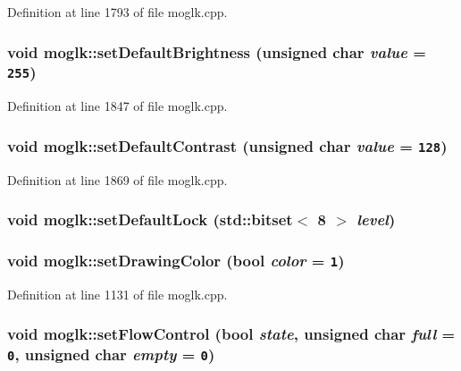 Definition at line 1793 of file moglk.cpp.\hypertarget{classmoglk_2a1af82f5cef9e807e43e2a9fa2636e2}{
\subsubsection[{setDefaultBrightness}]{\setlength{\rightskip}{0pt plus 5cm}void moglk::setDefaultBrightness (unsigned char {\em value} = {\tt 255})}}
\label{classmoglk_2a1af82f5cef9e807e43e2a9fa2636e2}




Definition at line 1847 of file moglk.cpp.\hypertarget{classmoglk_665a6e5ce6e0ba5b49a888e048bd4541}{
\subsubsection[{setDefaultContrast}]{\setlength{\rightskip}{0pt plus 5cm}void moglk::setDefaultContrast (unsigned char {\em value} = {\tt 128})}}
\label{classmoglk_665a6e5ce6e0ba5b49a888e048bd4541}




Definition at line 1869 of file moglk.cpp.\hypertarget{classmoglk_1f658975ec72ee94a416e03b80d940ec}{
\subsubsection[{setDefaultLock}]{\setlength{\rightskip}{0pt plus 5cm}void moglk::setDefaultLock (std::bitset$<$ 8 $>$ {\em level})}}
\label{classmoglk_1f658975ec72ee94a416e03b80d940ec}


\hypertarget{classmoglk_a1345114c86c6834619cf9a335458b96}{
\subsubsection[{setDrawingColor}]{\setlength{\rightskip}{0pt plus 5cm}void moglk::setDrawingColor (bool {\em color} = {\tt 1})}}
\label{classmoglk_a1345114c86c6834619cf9a335458b96}




Definition at line 1131 of file moglk.cpp.\hypertarget{classmoglk_09137664a708707066b2705b3a6d6894}{
\subsubsection[{setFlowControl}]{\setlength{\rightskip}{0pt plus 5cm}void moglk::setFlowControl (bool {\em state}, \/  unsigned char {\em full} = {\tt 0}, \/  unsigned char {\em empty} = {\tt 0})}}
\label{classmoglk_09137664a708707066b2705b3a6d6894}




